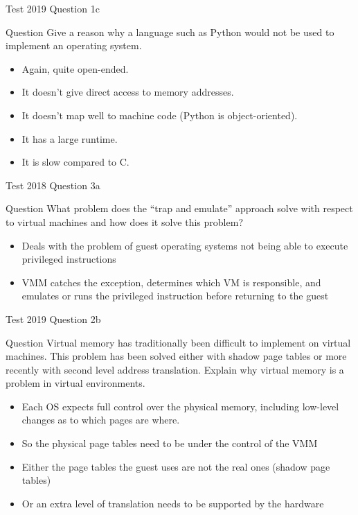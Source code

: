 \documentclass[notes]{beamer}
\begin{document}
\begin{frame}{Test 2019 Question 1c}
    \begin{alertblock}{Question}
        Give a reason why a language such as Python would not be used to implement an operating system.
    \end{alertblock}
    \pause
    \begin{itemize}
        \item Again, quite open-ended.
        \item It doesn't give direct access to memory addresses.
        \item It doesn't map well to machine code (Python is object-oriented).
        \item It has a large runtime.
        \item It is slow compared to C.
    \end{itemize}
\end{frame}
\begin{frame}{Test 2018 Question 3a}
    \begin{alertblock}{Question}
        What problem does the ``trap and emulate'' approach solve with respect to virtual machines and how does it solve this problem?
    \end{alertblock}
    \pause
    \begin{itemize}
        \item Deals with the problem of guest operating systems not being able to execute privileged instructions
        \item VMM catches the exception, determines which VM is responsible, and emulates or runs the privileged instruction before returning to the guest
    \end{itemize}
\end{frame}
\begin{frame}{Test 2019 Question 2b}
    \begin{alertblock}{Question}
        Virtual memory has traditionally been difficult to implement on virtual machines. This problem has been solved either with shadow page tables or more recently with second level address translation. Explain why virtual memory is a problem in virtual environments.
    \end{alertblock}
    \pause
    \begin{itemize}
        \item Each OS expects full control over the physical memory, including low-level changes as to which pages are where.
        \item So the physical page tables need to be under the control of the VMM
        \item Either the page tables the guest uses are not the real ones (shadow page tables)
        \item Or an extra level of translation needs to be supported by the hardware
    \end{itemize}
\end{frame}
\end{document}
